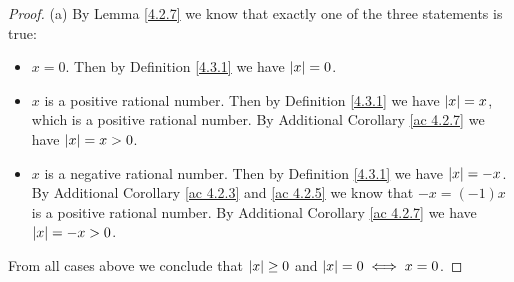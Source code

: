 \begin{proof}{(a)}
    By Lemma \ref{4.2.7} we know that exactly one of the three statements is true:
    \begin{itemize}
        \item \(x = 0\).
              Then by Definition \ref{4.3.1} we have \(\abs*{x} = 0\).
        \item \(x\) is a positive rational number.
              Then by Definition \ref{4.3.1} we have \(\abs*{x} = x\), which is a positive rational number.
              By Additional Corollary \ref{ac 4.2.7} we have \(\abs*{x} = x > 0\).
        \item \(x\) is a negative rational number.
              Then by Definition \ref{4.3.1} we have \(\abs*{x} = -x\).
              By Additional Corollary \ref{ac 4.2.3} and \ref{ac 4.2.5} we know that \(-x = (-1)x\) is a positive rational number.
              By Additional Corollary \ref{ac 4.2.7} we have \(\abs*{x} = -x > 0\).
    \end{itemize}
    From all cases above we conclude that \(\abs*{x} \geq 0\) and \(\abs*{x} = 0 \iff x = 0\).
\end{proof}

